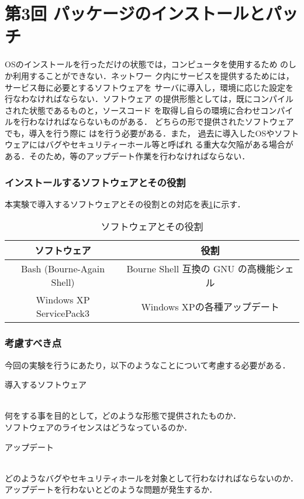 \section{第3回 パッケージのインストールとパッチ}
OSのインストールを行っただけの状態では，コンピュータを使用するため
の\textbf{}しか利用することができない．ネットワー
ク内にサービスを提供するためには，サービス毎に必要とするソフトウェアを
サーバに導入し，環境に応じた設定を行なわなければならない．ソフトウェア
の提供形態としては，既にコンパイルされた状態であるものと，ソースコード
を取得し自らの環境に合わせコンパイルを行わなければならないものがある．
どちらの形で提供されたソフトウェアでも，導入を行う際に
は\textbf{}を行う必要がある．また，
過去に導入したOSやソフトウェアにはバグやセキュリティーホール等と呼ばれ
る重大な欠陥がある場合がある．そのため，\textbf{}等のアップデート作業を行わなければならない．

\subsubsection*{インストールするソフトウェアとその役割}
本実験で導入するソフトウェアとその役割との対応を表\ref{sp3:tab:software1}に示す．

\begin{table}[htbp]
\begin{center}
\caption{ソフトウェアとその役割}
\label{sp3:tab:software1}
\begin{tabular}{|c|c|}
\hline
ソフトウェア & 役割 \\ \hline
Bash (Bourne-Again Shell) & Bourne Shell 互換の GNU の高機能シェル \\ \hline
Windows XP ServicePack3 & Windows XPの各種アップデート \\
\hline
\end{tabular}
\end{center}
\end{table}

\subsubsection*{考慮すべき点}
今回の実験を行うにあたり，以下のようなことについて考慮する必要がある．
\begin{itemize}
{\bf \item{導入するソフトウェア}}\\
何をする事を目的として，どのような形態で提供されたものか．\\
ソフトウェアのライセンスはどうなっているのか．

{\bf \item{アップデート}}\\
どのようなバグやセキュリティホールを対象として行わなければならないのか．\\
アップデートを行わないとどのような問題が発生するか．
\end{itemize}
